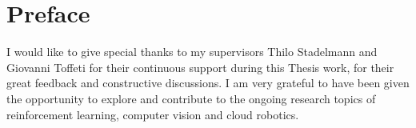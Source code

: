 \chapter*{Preface}
I would like to give special thanks to my supervisors Thilo Stadelmann and Giovanni Toffeti for their continuous support during this Thesis work, for their great feedback and constructive discussions. I am very grateful to have been given the opportunity to explore and contribute to the ongoing research topics of reinforcement learning, computer vision and cloud robotics.  

